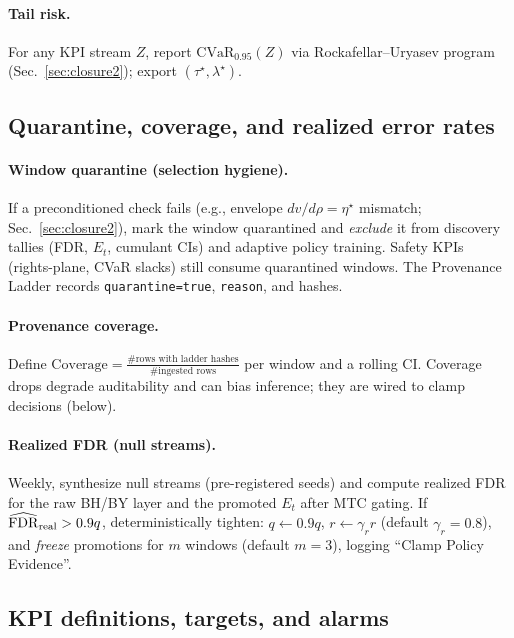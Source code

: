 \paragraph{Tail risk.}
For any KPI stream $Z$, report $\mathrm{CVaR}_{0.95}(Z)$ via Rockafellar–Uryasev program (Sec.~\ref{sec:closure2}); export $(\tau^\star,\lambda^\star)$.

\subsection*{Quarantine, coverage, and realized error rates}

\paragraph{Window quarantine (selection hygiene).}
If a preconditioned check fails (e.g., envelope $dv/d\rho=\eta^\star$ mismatch; Sec.~\ref{sec:closure2}), mark the window \textsf{quarantined} and \emph{exclude} it from discovery tallies (FDR, $E_t$, cumulant CIs) and adaptive policy training. Safety KPIs (rights-plane, CVaR slacks) still consume quarantined windows. The Provenance Ladder records \texttt{quarantine=true}, \texttt{reason}, and hashes.

\paragraph{Provenance coverage.}
Define $\mathrm{Coverage}=\frac{\#\text{rows with ladder hashes}}{\#\text{ingested rows}}$ per window and a rolling CI. Coverage drops degrade auditability and can bias inference; they are wired to clamp decisions (below).

\paragraph{Realized FDR (null streams).}
Weekly, synthesize null streams (pre-registered seeds) and compute realized FDR for the raw BH/BY layer and the promoted $E_t$ after MTC gating. If $\widehat{\mathrm{FDR}}_{\mathrm{real}}>0.9q$, deterministically tighten:
$q\leftarrow0.9q$, $r\leftarrow \gamma_r r$ (default $\gamma_r=0.8$), and \emph{freeze} promotions for $m$ windows (default $m=3$), logging “Clamp Policy Evidence”.

\subsection*{KPI definitions, targets, and alarms}

